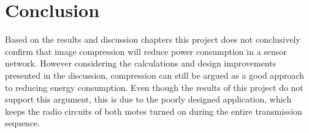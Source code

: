 \chapter{Conclusion}

Based on the results and discussion chapters this project does not conclusively confirm that image compression will reduce power consumption in a sensor network. However considering the calculations and design improvements presented in the discussion, compression can still be argued as a good approach to reducing energy consumption. Even though the results of this project do not support this argument, this is due to the poorly designed application, which keeps the radio circuits of both motes turned on during the entire transmission sequence. 